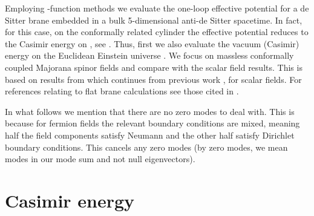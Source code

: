 \documentclass[a4paper,a4paper]{article}
\begin{document}
Employing \myHighlight{$\zeta$}\coordHE{}-function methods we evaluate the one-loop effective 
potential for a de Sitter brane embedded in a bulk 5-dimensional
anti-de Sitter spacetime. In fact, for this case, on the conformally related cylinder the 
effective potential reduces to the Casimir energy on \coordHE{}, see \cite{NOZ}. 
Thus, first we also evaluate the vacuum (Casimir) energy on the 
Euclidean Einstein universe \coordHE{}. We focus on massless 
conformally coupled Majorana spinor fields and compare with the scalar field 
results. 
This is based on results from \cite{MNSS} which continues from
previous work \cite{NS}, for scalar fields. For references relating to flat brane 
calculations see those cited in \cite{NS}. 

In what follows we mention that there 
are no zero modes to deal with. This is because for fermion fields the relevant 
boundary conditions are mixed, meaning half the field components satisfy Neumann 
and the other half satisfy Dirichlet boundary conditions. This cancels any zero modes 
(by zero modes, we mean \coordHE{} modes in our mode sum and not null eigenvectors).

\section{Casimir energy}
\end{document}
